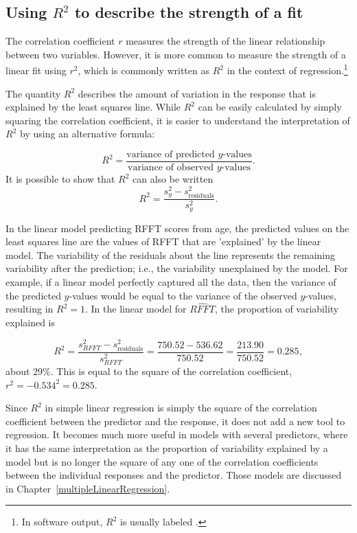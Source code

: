 
\subsection{Using $R^2$ to describe the strength of a fit}
\label{RSquaredLinearRegression}


The correlation coefficient $r$ measures the strength of the linear relationship between two variables. However, it is more common to measure the strength of a linear fit using $r^2$, which is commonly written as $R^2$ in the context of regression.\footnote{In software output, $R^2$ is usually labeled .} 

The quantity $R^2$ describes the amount of variation in the response that is explained by the least squares line. While $R^2$ can be easily calculated by simply squaring the correlation coefficient, it is easier to understand the interpretation of $R^2$ by using an alternative formula:

\[R^{2} = \dfrac{\text{variance of predicted $y$-values}}{\text{variance of observed $y$-values}}.\]
It is possible to show that $R^2$ can also be written
\[R^{2} = \dfrac{s^{2}_{y} - s_{\text{residuals}}^2}{s^{2}_{y}}.\]

In the linear model predicting RFFT scores from age, the predicted values on the least squares line are the values of RFFT that are 'explained' by the linear model. The variability of the residuals about the line represents the remaining variability after the prediction; i.e., the variability unexplained by the model. For example, if a linear model perfectly captured all the data, then the variance of the predicted $y$-values would be equal to the variance of the observed $y$-values, resulting in $R^2 = 1$. In the linear model for $\widehat{RFFT}$, the proportion of variability explained is

\[R^{2} = \dfrac{s^{2}_{RFFT} - s_{\text{residuals}}^2}{s^{2}_{RFFT}} = \dfrac{750.52 - 536.62}{750.52} = \dfrac{213.90}{750.52} = 0.285, \]
about 29\%. This is equal to the square of the correlation coefficient, $r^2 = -0.534^{2} = 0.285$. 

Since $R^2$ in simple linear regression is simply the square of the correlation coefficient between the predictor and the response, it does not add a new tool to regression.  It becomes much more useful in models with several predictors, where it has the same interpretation as the proportion of variability explained by a model but is no longer the square of any one of the correlation coefficients between the individual responses and the predictor.  Those models are discussed in Chapter~\ref{multipleLinearRegression}.


